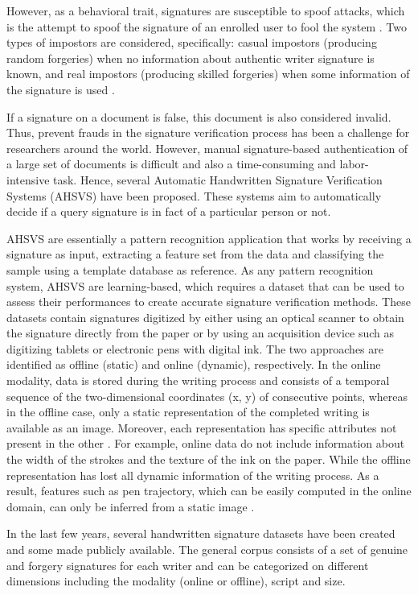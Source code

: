 However, as a behavioral trait, signatures are susceptible to spoof attacks, which is the attempt to spoof the signature of an enrolled user to fool the system \cite{jain2004biometrics}. Two types of impostors are considered, specifically: casual impostors (producing random forgeries) when no information about authentic writer signature is known, and real impostors (producing skilled forgeries) when some information of the signature is used \cite{fierrez2008handbook}.

If a signature on a document is false, this document is also considered invalid. Thus, prevent frauds in the signature verification process has been a challenge for researchers around the world. However, manual signature-based authentication of a large set of documents is difficult and also a time-consuming and labor-intensive task. Hence, several Automatic Handwritten Signature Verification Systems (AHSVS) have been proposed. These systems aim to automatically decide if a query signature is in fact of a particular person or not.

AHSVS are essentially a pattern recognition application that works by receiving a signature as input, extracting a feature set from the data and classifying the sample using a template database as reference. As any pattern recognition system, AHSVS are learning-based, which requires a dataset that can be used to assess their performances to create accurate signature verification methods. These datasets contain signatures digitized by either using an optical scanner to obtain the signature directly from the paper or by using an acquisition device such as digitizing tablets or electronic pens with digital ink. The two approaches are identified as offline (static) and online (dynamic), respectively. In the online modality, data is stored during the writing process and consists of a temporal sequence of the two-dimensional coordinates (x, y) of consecutive points, whereas in the offline case, only a static representation of the completed writing is available as an image. Moreover, each representation has specific attributes not present in the other \cite{viard1999ireste}. For example, online data do not include information about the width of the strokes and the texture of the ink on the paper. While the offline representation has lost all dynamic information of the writing process. As a result, features such as pen trajectory, which can be easily computed in the online domain, can only be inferred from a static image \cite{nel2005estimating}.

In the last few years, several handwritten signature datasets have been created and some made publicly available. The general corpus consists of a set of genuine and forgery signatures for each writer and can be categorized on different dimensions including the modality (online or offline), script and size.

